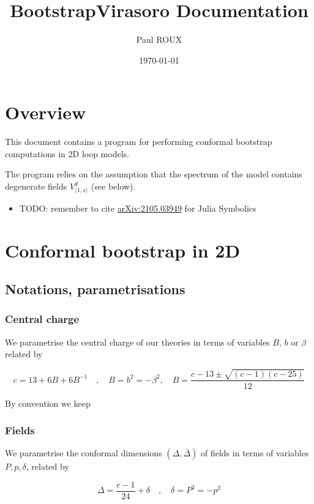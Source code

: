 \documentclass[a4paper]{article}
\author{Paul ROUX}
\date{\today}
\title{BootstrapVirasoro Documentation}
\numberwithin{equation}{section}
\begin{document}
\maketitle
\setcounter{tocdepth}{3}
\tableofcontents

\section{Overview}
\label{sec:org222ff30}

This document contains a program for performing conformal bootstrap computations in 2D loop models.

The program relies on the assumption that the spectrum of the model contains degenerate fields \(V^d_{\langle1,s\rangle}\) (see below).
\begin{itemize}
\item TODO: remember to cite \href{https://arxiv.org/abs/2105.03949}{arXiv:2105.03949} for Julia Symbolics
\label{sec:org996118c}
\end{itemize}
\section{Conformal bootstrap in 2D}
\label{sec:org91b71e5}

\subsection{Notations, parametrisations}
\label{sec:org75571db}

\subsubsection*{Central charge}
\label{sec:org64ec19c}

We parametrise the central charge of our theories in terms of variables \(B\), \(b\) or \(\beta\) related by

\[c = 13 + 6B + 6 B^{-1} \quad , \quad B = b^2 = -\beta^2, \quad B = \frac{c-13 \pm \sqrt{(c-1)(c-25)}}{12}\]

By convention we keep
\subsubsection*{Fields}
\label{sec:org6f0e859}

We parametrise the conformal dimensions \((\Delta, \bar\Delta)\) of fields in terms of variables \(P, p, \delta\), related by

\[
\Delta = \frac{c-1}{24} + \delta  \quad , \quad \delta = P^2 = -p^2
\]
\end{document}
